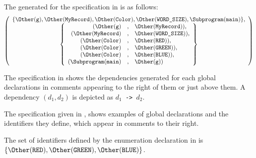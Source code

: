 The \dependencygraphterm{} generated for the specification in 
is as follows:
\[
\left(
\begin{array}{c}
  \{ \Other(\vg), \Other(\MyRecord), \Other(\Color), \Other(\vWORDSIZE), \Subprogram(\vmain) \},\\
  \left\{\begin{array}{rcl}
    ( \Other(\vg) &,&          \Other(\MyRecord) ),\\
    ( \Other(\MyRecord) &,&    \Other(\vWORDSIZE) ),\\
    ( \Other(\Color) &,&       \Other(\RED) ),\\
    ( \Other(\Color) &,&       \Other(\GREEN) ),\\
    ( \Other(\Color) &,&       \Other(\BLUE) ),\\
    ( \Subprogram(\vmain) &,&  \Other(\vg) )\\
  \end{array}\right\}
\end{array}
\right)
\]



The specification in 
shows the dependencies generated for each global declarations
in comments appearing to the right of them or just above them.
A dependency $(d_1,d_2)$ is depicted as \texttt{$d_1$ -> $d_2$}.



The specification given in ,
shows examples of global declarations and the identifiers they define,
which appear in comments to their right.



The set of identifiers defined by the enumeration declaration
in  is \\
$\{\Other(\RED), \Other(\GREEN), \Other(\BLUE)\}$.

